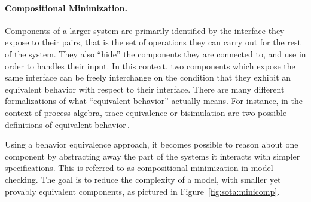 \paragraph{Compositional Minimization.}
%
Components of a larger system are primarily identified by the interface they
expose to their pairs, that is the set of operations they can carry out for the
rest of the system.
%
They also ``hide'' the components they are connected to, and use in order to
handles their input.
%
In this context, two components which expose the same interface can be freely
interchange on the condition that they exhibit an equivalent behavior with
respect to their interface.
%
There are many different formalizations of what ``equivalent behavior'' actually
means.
%
For instance, in the context of process algebra, trace equivalence or
bisimulation are two possible definitions of equivalent
behavior\,\cite{fokkink2013pa}.

Using a behavior equivalence approach, it becomes possible to reason about one
component by abstracting away the part of the systems it interacts with simpler
specifications.
%
This is referred to as compositional minimization in model checking.
%
The goal is to reduce the complexity of a model, with smaller yet provably
equivalent components, as pictured in Figure~\ref{fig:sota:minicomp}.

